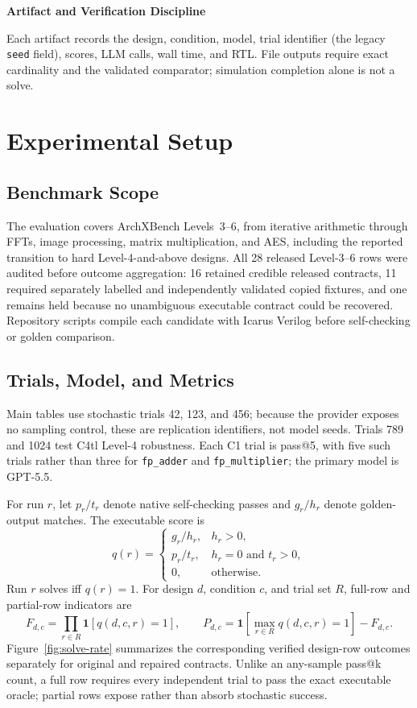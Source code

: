 \documentclass[sigconf,anonymous]{acmart}
\newcommand{\arch}{ArchXBench\xspace}
\newcommand{\cOne}{C1\xspace}
\newcommand{\cFourTL}{C4tl\xspace}
\begin{document}
\par{}
\noindent\textbf{\thesubsection\quad Artifact and Verification Discipline}\par
{}

Each artifact records the design, condition, model, trial identifier (the legacy \texttt{seed} field), scores, LLM calls, wall time, and RTL.
File outputs require exact cardinality and the validated comparator; simulation completion alone is not a solve.

\section{Experimental Setup}

\subsection{Benchmark Scope}

The evaluation covers \arch Levels~3--6, from iterative arithmetic through FFTs, image processing, matrix multiplication, and AES, including the reported transition to hard Level-4-and-above designs.
All 28 released Level-3--6 rows were audited before outcome aggregation: 16 retained credible released contracts, 11 required separately labelled and independently validated copied fixtures, and one remains held because no unambiguous executable contract could be recovered.
Repository scripts compile each candidate with Icarus Verilog before self-checking or golden comparison.

\subsection{Trials, Model, and Metrics}

Main tables use stochastic trials 42, 123, and 456; because the provider exposes no sampling control, these are replication identifiers, not model seeds.
Trials 789 and 1024 test \cFourTL Level-4 robustness.
Each \cOne trial is pass@5, with five such trials rather than three for \texttt{fp\_adder} and \texttt{fp\_multiplier}; the primary model is GPT-5.5.

For run $r$, let $p_r/t_r$ denote native self-checking passes and $g_r/h_r$ denote golden-output matches.
The executable score is
\[
q(r)=
\begin{cases}
g_r/h_r, & h_r>0,\\
p_r/t_r, & h_r=0 \text{ and } t_r>0,\\
0, & \text{otherwise}.
\end{cases}
\]
Run $r$ solves iff $q(r)=1$.
For design $d$, condition $c$, and trial set $R$, full-row and partial-row indicators are
\[
F_{d,c}=\prod_{r\in R}\mathbf{1}[q(d,c,r)=1],
\qquad
P_{d,c}=\mathbf{1}\!\left[\max_{r\in R} q(d,c,r)=1\right]-F_{d,c}.
\]
Figure~\ref{fig:solve-rate} summarizes the corresponding verified design-row outcomes separately for original and repaired contracts.
Unlike an any-sample pass@k count, a full row requires every independent trial to pass the exact executable oracle; partial rows expose rather than absorb stochastic success.
\end{document}

